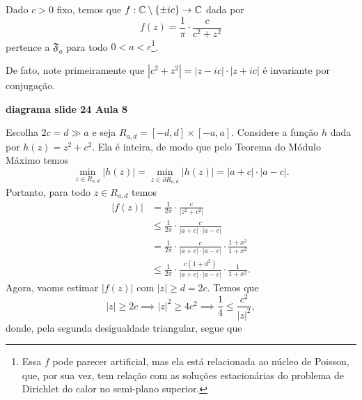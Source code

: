         \begin{exemplo}
            Dado $c>0$ fixo, temos que $f:\mathbb{C}\setminus\{\pm ic\}\to\mathbb{C}$ dada por
            \begin{equation*}
                f(z) = \frac{1}{\pi}\cdot\frac{c}{c^2 + z^2}
            \end{equation*}
            pertence a $\mathfrak{F}_a$ para todo $0 < a < c$\footnote{Essa $f$ pode parecer artificial,
            mas ela está relacionada ao núcleo de Poisson, que, por sua vez, tem relação com
            as soluções estacionárias do problema de Dirichlet do calor no semi-plano superior.}.
            
            De fato, note primeiramente que $|c^2+z^2| = |z-ic|\cdot |z+ic|$ é invariante por
            conjugação.
            \begin{center}
                {\bf diagrama slide 24 Aula 8}
            \end{center}
            Escolha $2c = d \gg a$ e seja $R_{a,d} = [-d,d]\times[-a,a]$.
            Considere a função $h$ dada por $h(z) = z^2 + c^2$. Ela é inteira, de modo que
            pelo Teorema do Módulo Máximo temos
            \begin{equation*}
                \min_{z\in R_{a,d}} |h(z)| = \min_{z\in\partial R_{a,d}} |h(z)| = |a+c|\cdot|a-c|.
            \end{equation*}
            Portanto, para todo $z\in R_{a,d}$ temos
            \begin{align*}
                |f(z)| &= \frac{1}{2\pi}\cdot\frac{c}{|z^2 + c^2|} \\
                       &\leq \frac{1}{2\pi}\cdot\frac{c}{|a+c|\cdot|a-c|} \\
                       &= \frac{1}{2\pi}\cdot\frac{c}{|a+c|\cdot|a-c|}\cdot\frac{1+x^2}{1+x^2} \\
                       &\leq\frac{1}{2\pi}\cdot\frac{c(1+d^2)}{|a+c|\cdot|a-c|}\cdot\frac{1}{1+x^2}.
            \end{align*}
            Agora, vaoms estimar $|f(z)|$ com $|z|\geq d = 2c$. Temos que
            \begin{equation*}
                |z|\geq 2c \implies |z|^2 \geq 4c^2 \implies \frac{1}{4} \leq \frac{c^2}{|z|^2},
            \end{equation*}
            donde, pela segunda desigualdade triangular, segue que

\end{exemplo}
